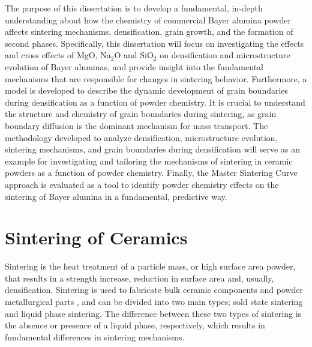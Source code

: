 The purpose of this dissertation is to develop a fundamental, in-depth understanding about how the chemistry of commercial Bayer alumina powder affects sintering mechanisms, densification, grain growth, and the formation of second phases. Specifically, this dissertation will focus on investigating the effects and cross effects of MgO, Na$_{2}$O and SiO$_{2}$ on densification and microstructure evolution of Bayer aluminas, and provide insight into the fundamental mechanisms that are responsible for changes in sintering behavior. Furthermore, a model is developed to describe the dynamic development of grain boundaries during densification as a function of powder chemistry. It is crucial to understand the structure and chemistry of grain boundaries during sintering, as grain boundary diffusion is the dominant mechanism for mass transport. The methodology developed to analyze densification, microstructure evolution, sintering mechanisms, and grain boundaries during densification will serve as an example for investigating and tailoring the mechanisms of sintering in ceramic powders as a function of powder chemistry. Finally, the Master Sintering Curve approach is evaluated as a tool to identify powder chemistry effects on the sintering of Bayer alumina in a fundamental, predictive way.

\section{Sintering of Ceramics}
Sintering is the heat treatment of a particle mass, or high surface area powder, that results in a strength increase, reduction in surface area and, usually, densification. Sintering is used to fabricate bulk ceramic components and powder metallurgical parts \cite{Kang2004}, and can be divided into two main types; sold state sintering and liquid phase sintering. The difference between these two types of sintering is the absence or presence of a liquid phase, respectively, which results in fundamental differences in sintering mechanisms. 

